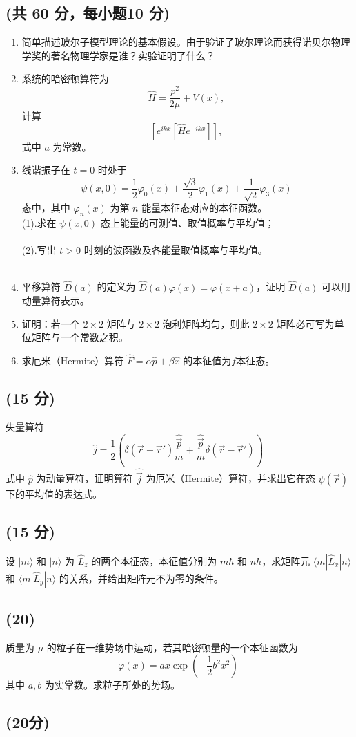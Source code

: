 
\subsection{(共 60 分，每小题10 分)}
\begin{enumerate}
\item 简单描述玻尔子模型理论的基本假设。由于验证了玻尔理论而获得诺贝尔物理学奖的著名物理学家是谁？实验证明了什么？

\item 系统的哈密顿算符为 
$$\hat{H} = \frac{p^2}{2\mu} + V(x),~$$
计算
$$\left[e^{ikx}[\hat{H}e^{-ikx}]\right],~$$
式中 $a$ 为常数。

\item 线谐振子在 $t = 0$ 时处于
$$ \psi(x, 0) = \frac{1}{2}\varphi_0(x) + \frac{\sqrt{3}}{2}\varphi_1(x) + \frac{1}{\sqrt{2}}\varphi_3(x)~ $$
态中，其中 $\varphi_n(x)$ 为第 $n$ 能量本征态对应的本征函数。\\
(1).求在 $\psi(x, 0)$ 态上能量的可测值、取值概率与平均值；\\\\
(2).写出 $t > 0$ 时刻的波函数及各能量取值概率与平均值。\\\\
\item 平移算符 $\hat{D}(a)$ 的定义为 $\hat{D}(a)\varphi(x) = \varphi(x + a)$，证明 $\hat{D}(a)$ 可以用动量算符表示。

\item 证明：若一个 $2 \times 2$ 矩阵与 $2 \times 2$ 泡利矩阵均匀，则此 $2 \times 2$ 矩阵必可写为单位矩阵与一个常数之积。

\item 求厄米（Hermite）算符 $\hat{F} = \alpha\hat{p} + \beta\hat{x}$ 的本征值为$f$本征态。
\end{enumerate}
\subsection{(15 分)}
失量算符
\[
\hat{j} = \frac{1}{2} \left( \delta(\vec{r} - \vec{r}') \frac{\hat{\vec{p}}}{m} + \frac{\hat{\vec{p}}}{m} \delta(\vec{r} - \vec{r}') \right)~
\]
式中 $\hat{p}$ 为动量算符，证明算符 $\hat{\vec{j}}$ 为厄米（Hermite）算符，并求出它在态 $\psi(\vec{r})$ 下的平均值的表达式。

\subsection{(15 分)}
设 $|m\rangle$ 和 $|n\rangle$ 为 $\hat{L}_z$ 的两个本征态，本征值分别为 $m\hbar$ 和 $n\hbar$，求矩阵元 $\langle m| \hat{L}_x |n \rangle$ 和 $\langle m| \hat{L}_y |n \rangle$ 的关系，并给出矩阵元不为零的条件。
\subsection{(20)}
质量为 $\mu$ 的粒子在一维势场中运动，若其哈密顿量的一个本征函数为
\[
\varphi(x) = a x \exp \left( -\frac{1}{2}b^2 x^2 \right)~
\]
其中 $a, b$ 为实常数。求粒子所处的势场。
\subsection{(20分)}
